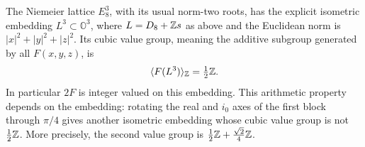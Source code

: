\begin{statement}
The Niemeier lattice \(E_8^3\), with its usual norm-two roots, has the
explicit isometric embedding \(L^3\subset\mathbb O^3\), where
\(L=D_8+\mathbb Z s\) as above and the Euclidean norm is
\(|x|^2+|y|^2+|z|^2\). Its cubic value group, meaning the additive
subgroup generated by all \(F(x,y,z)\), is
\[
 \langle F(L^3)\rangle_{\mathbb Z}=\tfrac12\mathbb Z.
\]
In particular \(2F\) is integer valued on this embedding. This
arithmetic property depends on the embedding: rotating the real and
\(i_0\) axes of the first block through \(\pi/4\) gives another
isometric embedding whose cubic value group is not \(\tfrac12\mathbb Z\).
More precisely, the second value group is
\(\tfrac12\mathbb Z+\tfrac{\sqrt2}{4}\mathbb Z\).
\end{statement}

